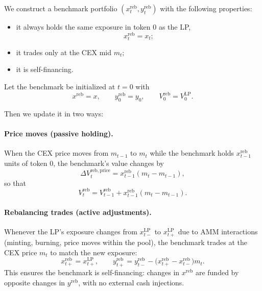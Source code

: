 \documentclass[11pt]{article}
\begin{document}
We construct a benchmark portfolio $(x_t^{\mathrm{reb}}, y_t^{\mathrm{reb}})$ with the
following properties:
\begin{itemize}[leftmargin=*]
  \item it always holds the same exposure in token 0 as the LP,
        \begin{equation}
          x_t^{\mathrm{reb}} = x_t;
        \end{equation}
  \item it trades only at the CEX mid $m_t$;
  \item it is self-financing.
\end{itemize}

Let the benchmark be initialized at $t=0$ with
\begin{equation}
  x^{\mathrm{reb}} = x,\qquad
  y_0^{\mathrm{reb}} = y_0,\qquad
  V_0^{\mathrm{reb}} = V_0^{\mathrm{LP}}.
\end{equation}

Then we update it in two ways:

\paragraph{Price moves (passive holding).}
When the CEX price moves from $m_{t-1}$ to $m_t$ while the benchmark holds
$x_{t-1}^{\mathrm{reb}}$ units of token 0, the benchmark's value changes by
\begin{equation}
  \Delta V_t^{\mathrm{reb},\mathrm{price}} =
  x_{t-1}^{\mathrm{reb}} (m_t - m_{t-1}),
\end{equation}
so that
\begin{equation}
  V_t^{\mathrm{reb}} = V_{t-1}^{\mathrm{reb}}
                       + x_{t-1}^{\mathrm{reb}} (m_t - m_{t-1}).
\end{equation}

\paragraph{Rebalancing trades (active adjustments).}
Whenever the LP's exposure changes from $x_{t-}^{\mathrm{LP}}$ to $x_{t+}^{\mathrm{LP}}$
due to AMM interactions (minting, burning, price moves within the pool), the benchmark
trades at the CEX price $m_t$ to match the new exposure:
\begin{equation}
  x_{t+}^{\mathrm{reb}} = x_{t+}^{\mathrm{LP}},\qquad
  y_{t+}^{\mathrm{reb}} = y_{t-}^{\mathrm{reb}}
                         - \bigl(x_{t+}^{\mathrm{reb}} - x_{t-}^{\mathrm{reb}}\bigr) m_t.
\end{equation}
This ensures the benchmark is self-financing:
changes in $x^{\mathrm{reb}}$ are funded by opposite changes in $y^{\mathrm{reb}}$, with no
external cash injections.
\end{document}

